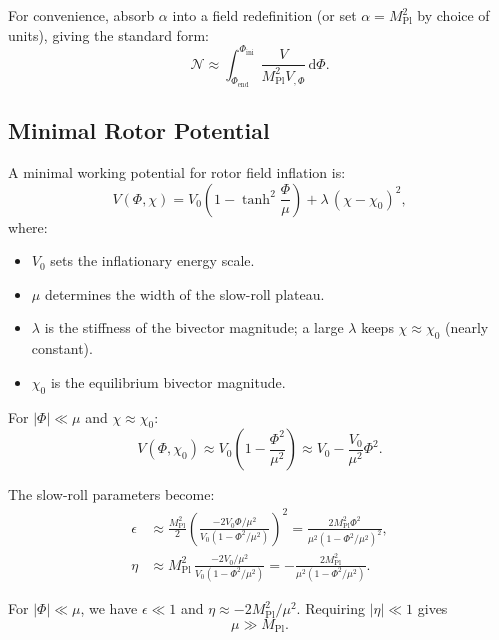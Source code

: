 \documentclass[11pt,a4paper]{article}
\numberwithin{equation}{section}
\theoremstyle{plain}
\theoremstyle{definition}
\theoremstyle{remark}
\newcommand{\dd}{\mathrm{d}}
\begin{document}
For convenience, absorb $\alpha$ into a field redefinition (or set $\alpha = M_{\mathrm{Pl}}^2$ by choice of units), giving the standard form:
\begin{equation}
\mathcal{N} \approx \int_{\Phi_{\mathrm{end}}}^{\Phi_{\mathrm{ini}}}\frac{V}{M_{\mathrm{Pl}}^2 V_{,\Phi}}\,\dd\Phi.
\label{eq:efolds-standard}
\end{equation}

\subsection{Minimal Rotor Potential}

A minimal working potential for rotor field inflation is:
\begin{equation}
V(\Phi,\chi) = V_0\left(1 - \tanh^2\frac{\Phi}{\mu}\right) + \lambda\,(\chi - \chi_0)^2,
\label{eq:potential}
\end{equation}
where:
\begin{itemize}
  \item $V_0$ sets the inflationary energy scale.
  \item $\mu$ determines the width of the slow-roll plateau.
  \item $\lambda$ is the stiffness of the bivector magnitude; a large $\lambda$ keeps $\chi \approx \chi_0$ (nearly constant).
  \item $\chi_0$ is the equilibrium bivector magnitude.
\end{itemize}

For $|\Phi| \ll \mu$ and $\chi \approx \chi_0$:
\begin{equation}
V(\Phi,\chi_0) \approx V_0\left(1 - \frac{\Phi^2}{\mu^2}\right) \approx V_0 - \frac{V_0}{\mu^2}\Phi^2.
\end{equation}

The slow-roll parameters become:
\begin{align}
\epsilon &\approx \frac{M_{\mathrm{Pl}}^2}{2}\left(\frac{-2V_0\Phi/\mu^2}{V_0(1-\Phi^2/\mu^2)}\right)^2 = \frac{2M_{\mathrm{Pl}}^2\Phi^2}{\mu^2(1-\Phi^2/\mu^2)^2},\\
\eta &\approx M_{\mathrm{Pl}}^2\,\frac{-2V_0/\mu^2}{V_0(1-\Phi^2/\mu^2)} = -\frac{2M_{\mathrm{Pl}}^2}{\mu^2(1-\Phi^2/\mu^2)}.
\end{align}

For $|\Phi| \ll \mu$, we have $\epsilon \ll 1$ and $\eta \approx -2M_{\mathrm{Pl}}^2/\mu^2$. Requiring $|\eta| \ll 1$ gives
\begin{equation}
\mu \gg M_{\mathrm{Pl}}.
\label{eq:mu-constraint}
\end{equation}
\end{document}
